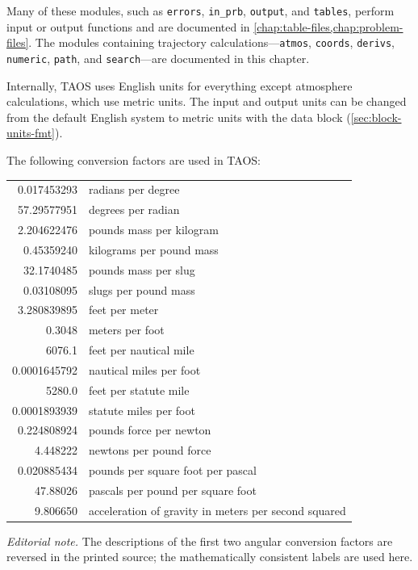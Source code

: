 Many of these modules, such as \texttt{errors}, \texttt{in\_prb}, \texttt{output},
and \texttt{tables}, perform input or output functions and are documented in
\cref{chap:table-files,chap:problem-files}. The modules containing trajectory
calculations---\texttt{atmos}, \texttt{coords}, \texttt{derivs}, \texttt{numeric},
\texttt{path}, and \texttt{search}---are documented in this chapter.


Internally, TAOS uses English units for everything except atmosphere calculations,
which use metric units. The input and output units can be changed from the default
English system to metric units with the  data block
(\cref{sec:block-units-fmt}).

The following conversion factors are used in TAOS:
\begin{center}
\begin{tabular}{@{}r l@{}}
  \num{0.017453293} & radians per degree \\
  \num{57.29577951} & degrees per radian \\
  \num{2.204622476} & pounds mass per kilogram \\
  \num{0.45359240} & kilograms per pound mass \\
  \num{32.1740485} & pounds mass per slug \\
  \num{0.03108095} & slugs per pound mass \\
  \num{3.280839895} & feet per meter \\
  \num{0.3048} & meters per foot \\
  \num{6076.1} & feet per nautical mile \\
  \num{0.0001645792} & nautical miles per foot \\
  \num{5280.0} & feet per statute mile \\
  \num{0.0001893939} & statute miles per foot \\
  \num{0.224808924} & pounds force per newton \\
  \num{4.448222} & newtons per pound force \\
  \num{0.020885434} & pounds per square foot per pascal \\
  \num{47.88026} & pascals per pound per square foot \\
  \num{9.806650} & acceleration of gravity in meters per second squared \\
\end{tabular}
\end{center}

\noindent\textit{Editorial note.} The descriptions of the first two angular
conversion factors are reversed in the printed source; the mathematically consistent
labels are used here.
